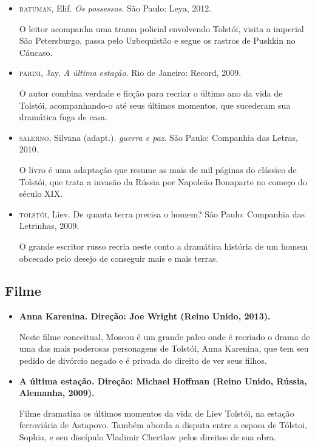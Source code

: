 \documentclass{extarticle}
\begin{document}
\begin{itemize}
\item\textsc{batuman}, Elif. \textit{Os possessos}. São Paulo: Leya, 2012.

O leitor acompanha uma trama policial envolvendo Tolstói, visita a
imperial São Petersburgo, passa pelo Uzbequistão e segue os rastros de
Pushkin no Cáucaso.

\item\textsc{parini}, Jay. \textit{A última estação}. Rio de Janeiro: Record, 2009.

O autor combina verdade e ficção para recriar o último ano da vida de
Tolstói, acompanhando-o até seus últimos momentos, que sucederam sua
dramática fuga de casa.

\item\textsc{salerno}, Silvana (adapt.). \textit{guerra e paz}. São Paulo: Companhia
das Letras, 2010.

O livro é uma adaptação que resume as mais de mil páginas do clássico de
Tolstói, que trata a invasão da Rússia por Napoleão Bonaparte no começo
do século XIX.

\item\textsc{tolstói}, Liev. De quanta terra precisa o homem? São Paulo:
Companhia das Letrinhas, 2009.

O grande escritor russo recria neste conto a dramática história de um
homem obcecado pelo desejo de conseguir mais e mais terras.
\end{itemize}

\subsection{Filme}

\begin{itemize}
\item\textbf{Anna Karenina. Direção: Joe Wright (Reino Unido, 2013).}

Neste filme conceitual, Moscou é um grande palco onde é recriado o drama
de uma das mais poderosas personagens de Tolstói, Anna Karenina, que tem
seu pedido de divórcio negado e é privada do direito de ver seus filhos.

\item\textbf{A última estação. Direção: Michael Hoffman (Reino Unido, Rússia,
Alemanha, 2009).}

Filme dramatiza os últimos momentos da vida de Liev Tolstói, na estação
ferroviária de Astapovo. Também aborda a disputa entre a esposa de
Tólstoi, Sophia, e seu discípulo Vladimir Chertkov pelos direitos de sua
obra.
\end{itemize}
\end{document}

